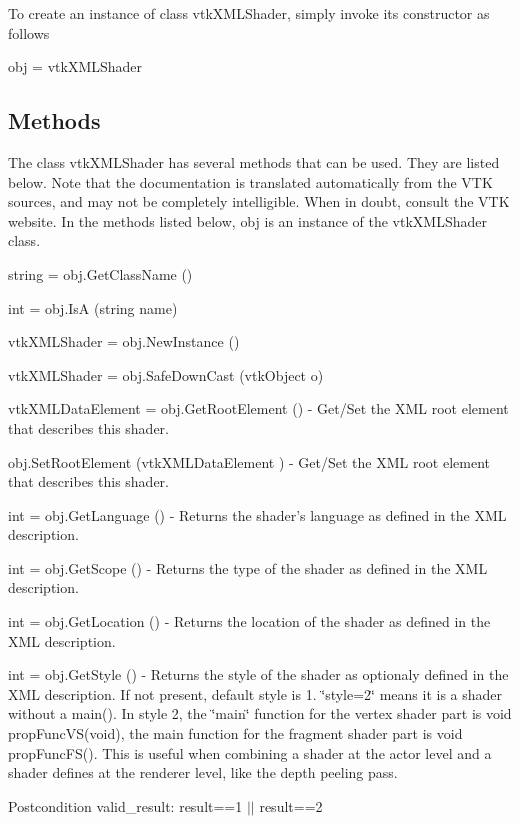 To create an instance of class vtk\-X\-M\-L\-Shader, simply invoke its constructor as follows \begin{DoxyVerb}  obj = vtkXMLShader
\end{DoxyVerb}
 \hypertarget{vtkwidgets_vtkxyplotwidget_Methods}{}\subsection{Methods}\label{vtkwidgets_vtkxyplotwidget_Methods}
The class vtk\-X\-M\-L\-Shader has several methods that can be used. They are listed below. Note that the documentation is translated automatically from the V\-T\-K sources, and may not be completely intelligible. When in doubt, consult the V\-T\-K website. In the methods listed below, {\ttfamily obj} is an instance of the vtk\-X\-M\-L\-Shader class. 
\begin{DoxyItemize}
\item {\ttfamily string = obj.\-Get\-Class\-Name ()}  
\item {\ttfamily int = obj.\-Is\-A (string name)}  
\item {\ttfamily vtk\-X\-M\-L\-Shader = obj.\-New\-Instance ()}  
\item {\ttfamily vtk\-X\-M\-L\-Shader = obj.\-Safe\-Down\-Cast (vtk\-Object o)}  
\item {\ttfamily vtk\-X\-M\-L\-Data\-Element = obj.\-Get\-Root\-Element ()} -\/ Get/\-Set the X\-M\-L root element that describes this shader.  
\item {\ttfamily obj.\-Set\-Root\-Element (vtk\-X\-M\-L\-Data\-Element )} -\/ Get/\-Set the X\-M\-L root element that describes this shader.  
\item {\ttfamily int = obj.\-Get\-Language ()} -\/ Returns the shader's language as defined in the X\-M\-L description.  
\item {\ttfamily int = obj.\-Get\-Scope ()} -\/ Returns the type of the shader as defined in the X\-M\-L description.  
\item {\ttfamily int = obj.\-Get\-Location ()} -\/ Returns the location of the shader as defined in the X\-M\-L description.  
\item {\ttfamily int = obj.\-Get\-Style ()} -\/ Returns the style of the shader as optionaly defined in the X\-M\-L description. If not present, default style is 1. \char`\"{}style=2\char`\"{} means it is a shader without a main(). In style 2, the \char`\"{}main\char`\"{} function for the vertex shader part is void prop\-Func\-V\-S(void), the main function for the fragment shader part is void prop\-Func\-F\-S(). This is useful when combining a shader at the actor level and a shader defines at the renderer level, like the depth peeling pass. \begin{DoxyPostcond}{Postcondition}
valid\-\_\-result\-: result==1 $|$$|$ result==2  
\end{DoxyPostcond}


\end{DoxyItemize}
